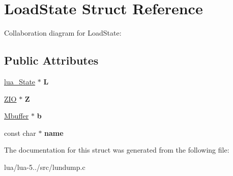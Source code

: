 \hypertarget{struct_load_state}{\section{Load\+State Struct Reference}
\label{struct_load_state}
}


Collaboration diagram for Load\+State\+:
\subsection*{Public Attributes}
\begin{DoxyCompactItemize}
\item 
\hypertarget{struct_load_state_a8eabd10510332ab5eaf5244bb347bac2}{\hyperlink{structlua___state}{lua\+\_\+\+State} $\ast$ {\bfseries L}}\label{struct_load_state_a8eabd10510332ab5eaf5244bb347bac2}

\item 
\hypertarget{struct_load_state_a53f2d5fa2c176bdf96701c983afb8182}{\hyperlink{struct_zio}{Z\+I\+O} $\ast$ {\bfseries Z}}\label{struct_load_state_a53f2d5fa2c176bdf96701c983afb8182}

\item 
\hypertarget{struct_load_state_a6f7641cccb52a4df4b55890dee8dcbc8}{\hyperlink{struct_mbuffer}{Mbuffer} $\ast$ {\bfseries b}}\label{struct_load_state_a6f7641cccb52a4df4b55890dee8dcbc8}

\item 
\hypertarget{struct_load_state_a0cd70a73d5f61472258ebb5256abbaef}{const char $\ast$ {\bfseries name}}\label{struct_load_state_a0cd70a73d5f61472258ebb5256abbaef}

\end{DoxyCompactItemize}


The documentation for this struct was generated from the following file\+:\begin{DoxyCompactItemize}
\item 
lua/lua-\/5../src/lundump.\+c\end{DoxyCompactItemize}
